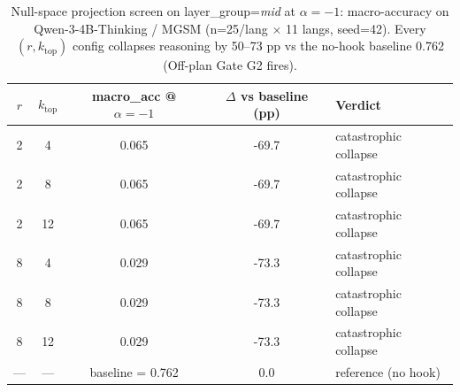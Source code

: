 \begin{table}[t]
\centering
\caption{Null-space projection screen on layer\_group=\emph{mid} at $\alpha=-1$: macro-accuracy on Qwen-3-4B-Thinking / MGSM (n=25/lang $\times$ 11 langs, seed=42). Every $(r, k_{\text{top}})$ config collapses reasoning by 50--73 pp vs the no-hook baseline 0.762 (Off-plan Gate G2 fires).}
\label{tab:c2_screen_grid}
\begin{tabular}{ccccl}
\toprule
$r$ & $k_{\text{top}}$ & macro\_acc @ $\alpha=-1$ & $\Delta$ vs baseline (pp) & Verdict \\
\midrule
2 & 4 & 0.065 & -69.7 & catastrophic collapse \\
2 & 8 & 0.065 & -69.7 & catastrophic collapse \\
2 & 12 & 0.065 & -69.7 & catastrophic collapse \\
8 & 4 & 0.029 & -73.3 & catastrophic collapse \\
8 & 8 & 0.029 & -73.3 & catastrophic collapse \\
8 & 12 & 0.029 & -73.3 & catastrophic collapse \\
\midrule --- & --- & baseline = 0.762 & 0.0 & reference (no hook) \\
\bottomrule
\end{tabular}
\end{table}

